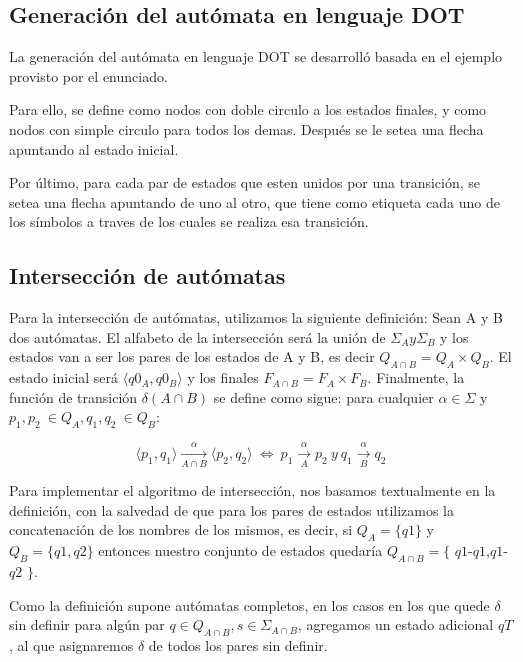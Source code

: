 \documentclass[a4paper, 10pt, twoside]{article}
\begin{document}
\subsection{Generación del autómata en lenguaje DOT}

La generación del autómata en lenguaje DOT se desarrolló basada en el ejemplo provisto por el enunciado. 

Para ello, se define como nodos con doble circulo a los estados finales, y como nodos con simple circulo para todos los demas. Después se le setea una flecha apuntando al estado inicial.

Por último, para cada par de estados que esten unidos por una transición, se setea una flecha apuntando de uno al otro, que tiene como etiqueta cada uno de los símbolos a traves de los cuales se realiza esa transición.

\subsection{Intersección de autómatas}

Para la intersección de autómatas, utilizamos la siguiente definición: Sean A y B dos autómatas. El alfabeto de la intersección será la unión de $\Sigma_A y \Sigma_B$ y los estados van a ser los pares de los estados de A y B, es decir $Q_{A \cap B} = Q_A \times Q_B$. El estado inicial será $\langle q0_A,q0_B \rangle$ y los finales $F_{A \cap B} = F_A \times F_B$. Finalmente, la función de transición $\delta(A\cap B)$ se define como sigue: para cualquier $\alpha \in \Sigma$ y $p_1, p_2\ \in Q_A, q_1, q_2\ \in Q_B$:

$$\langle p_1,q_1\rangle \xrightarrow[A\cap B]{\alpha}\langle p_2,q_2\rangle \ \Leftrightarrow \ p_1\xrightarrow[A]{\alpha}p_2\ y\ q_1\xrightarrow[B]{\alpha}q_2$$


Para implementar el algoritmo de intersección, nos basamos textualmente en la definición, con la salvedad de que para los pares de estados utilizamos la concatenación de los nombres de los mismos, es decir, si $ Q_A = \lbrace q1 \rbrace$ y $Q_B = \lbrace q1, q2 \rbrace $ entonces nuestro conjunto de estados quedaría $Q_{A \cap B} = \lbrace$ $q1$-$q1$,$q1$-$q2$ $\rbrace$.

Como la definición supone autómatas completos, en los casos en los que quede $\delta$ sin definir para algún par $q \in Q_{A \cap B}, s \in \Sigma_{A \cap B}$, agregamos un estado adicional $qT$, al que asignaremos $\delta$ de todos los pares sin definir.
\end{document}
